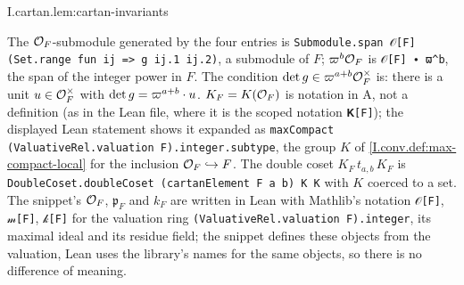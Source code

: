 \begin{lemma}
\end{lemma}
\begin{tfformal}{I.cartan.lem:cartan-invariants}
\begin{tffidelity}
The $\mathcal{O}_F$-submodule generated by the four entries is \texttt{Submodule.span 𝒪[F] (Set.range fun ij => g ij.1 ij.2)}, a submodule of $F$; $\varpi^b\mathcal{O}_F$ is \texttt{𝒪[F] ∙ ϖ\^{}b}, the span of the integer power in $F$. The condition $\det g\in\varpi^{a+b}\mathcal{O}_F^\times$ is: there is a unit $u\in\mathcal{O}_F^\times$ with $\det g=\varpi^{a+b}\cdot u$. $K_F=K(\mathcal{O}_F)$ is notation in A, not a definition (as in the Lean file, where it is the scoped notation \texttt{𝐊[F]}); the displayed Lean statement shows it expanded as \texttt{maxCompact (ValuativeRel.valuation F).integer.subtype}, the group $K$ of \cref{I.conv.def:max-compact-local} for the inclusion $\mathcal{O}_F\hookrightarrow F$. The double coset $K_F\,t_{a,b}\,K_F$ is \texttt{DoubleCoset.doubleCoset (cartanElement F a b) K K} with $K$ coerced to a set. The snippet's $\mathcal{O}_F$, $\mathfrak p_F$ and $k_F$ are written in Lean with Mathlib's notation \texttt{𝒪[F]}, \texttt{𝓂[F]}, \texttt{𝓀[F]} for the valuation ring \texttt{(ValuativeRel.valuation F).integer}, its maximal ideal and its residue field; the snippet defines these objects from the valuation, Lean uses the library's names for the same objects, so there is no difference of meaning.
\end{tffidelity}
\end{tfformal}
